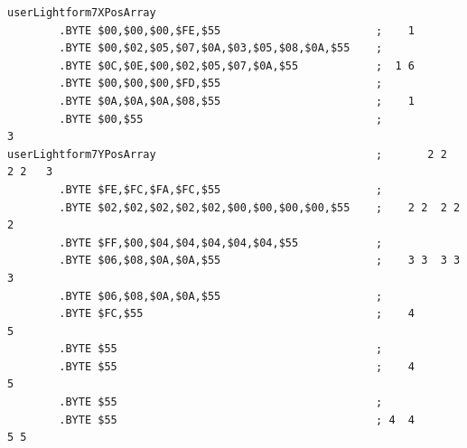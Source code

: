 \begin{lstlisting}[basicstyle=\ttfamily\scriptsize]
userLightform7XPosArray
        .BYTE $00,$00,$00,$FE,$55                        ;    1              
        .BYTE $00,$02,$05,$07,$0A,$03,$05,$08,$0A,$55    ;                   
        .BYTE $0C,$0E,$00,$02,$05,$07,$0A,$55            ;  1 6              
        .BYTE $00,$00,$00,$FD,$55                        ;                   
        .BYTE $0A,$0A,$0A,$08,$55                        ;    1              
        .BYTE $00,$55                                    ;                3  
userLightform7YPosArray                                  ;       2 2  2 2   3
        .BYTE $FE,$FC,$FA,$FC,$55                        ;                   
        .BYTE $02,$02,$02,$02,$02,$00,$00,$00,$00,$55    ;    2 2  2 2  2    
        .BYTE $FF,$00,$04,$04,$04,$04,$04,$55            ;                   
        .BYTE $06,$08,$0A,$0A,$55                        ;    3 3  3 3  3    
        .BYTE $06,$08,$0A,$0A,$55                        ;                   
        .BYTE $FC,$55                                    ;    4         5    
        .BYTE $55                                        ;                   
        .BYTE $55                                        ;    4         5    
        .BYTE $55                                        ;                   
        .BYTE $55                                        ; 4  4       5 5    
\end{lstlisting}


